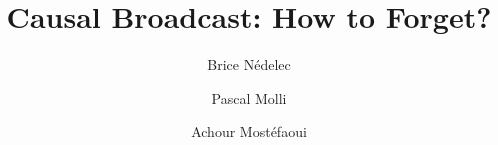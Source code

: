 \documentclass[english,a4paper]{lipics-v2018}
\author{Brice N{\'e}delec}{\affLSNN}{brice.nedelec@ls2n.fr}{}{}
\author{Pascal Molli}{\affLSNN}{pascal.molli@ls2n.fr}{}{}
\author{Achour Most{\'e}faoui}{\affLSNN}{achour.mostefaoui@ls2n.fr}{}{}
\newcommand{\affLSNN}{LS2N, University of Nantes,
   2 rue de la Houssini{\`e}re,
   BP 92208, 44322 Nantes Cedex 3, France}%
\begin{document}
 


\title{Causal Broadcast: How to Forget?}





\maketitle









% 




% 
  
\end{document}
